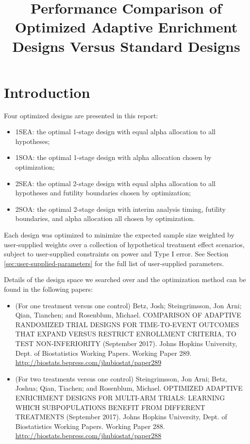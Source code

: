 \documentclass{article}\usepackage[]{graphicx}\usepackage[]{color}
\numberwithin{table}{section}
\numberwithin{figure}{section}
\begin{document}
\clearpage

\title{Performance Comparison of Optimized Adaptive Enrichment Designs Versus Standard Designs}
\maketitle
\section{Introduction}

Four optimized designs are presented in this report:
\begin{itemize}
    \item 1SEA: the optimal 1-stage design with equal alpha allocation to all hypotheses; 
    \item 1SOA: the optimal 1-stage design with alpha allocation chosen by optimization;
    \item 2SEA: the optimal 2-stage design with equal alpha allocation to all hypotheses and futility boundaries chosen by optimization;
    \item 2SOA: the optimal 2-stage design with interim analysis timing, futility boundaries, and alpha allocation all chosen by optimization.
\end{itemize}
Each design was optimized to minimize the expected sample size weighted by user-supplied weights over a collection of hypothetical treatment effect scenarios, subject to user-supplied constraints on power and Type I error. See Section \ref{sec:user-supplied-parameters} for the full list of user-supplied parameters.

Details of the design space we searched over and the optimization method can be found in the following papers:
\begin{itemize}
\item (For one treatment versus one control) Betz, Josh; Steingrimsson, Jon Arni; Qian, Tianchen; and Rosenblum, Michael. COMPARISON OF ADAPTIVE RANDOMIZED TRIAL DESIGNS FOR TIME-TO-EVENT OUTCOMES THAT EXPAND VERSUS RESTRICT ENROLLMENT CRITERIA, TO TEST NON-INFERIORITY (September 2017). Johns Hopkins University, Dept. of Biostatistics Working Papers. Working Paper 289. \url{http://biostats.bepress.com/jhubiostat/paper289}
\item (For two treatments versus one control) Steingrimsson, Jon Arni; Betz, Joshua; Qian, Tiachen; and Rosenblum, Michael. OPTIMIZED ADAPTIVE ENRICHMENT DESIGNS FOR MULTI-ARM TRIALS: LEARNING WHICH SUBPOPULATIONS BENEFIT FROM DIFFERENT TREATMENTS (September 2017). Johns Hopkins University, Dept. of Biostatistics Working Papers. Working Paper 288. \url{http://biostats.bepress.com/jhubiostat/paper288}
\end{itemize}
\end{document}
